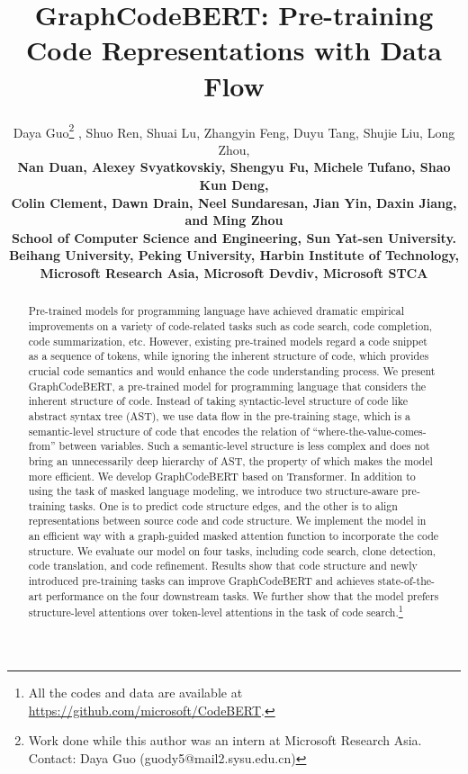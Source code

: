 \documentclass{article} \usepackage{iclr2021_conference,times}
\title{GraphCodeBERT: Pre-training Code Representations with Data Flow}
\author{Daya Guo\thanks{Work done while this author was an intern at Microsoft Research Asia. Contact: Daya Guo (guody5@mail2.sysu.edu.cn) } , Shuo Ren, Shuai Lu, Zhangyin Feng, Duyu Tang, Shujie Liu, Long Zhou, \\ \bf{Nan Duan, Alexey Svyatkovskiy, Shengyu Fu, Michele Tufano, Shao Kun Deng,} \\ \bf{Colin Clement, Dawn Drain, Neel Sundaresan, Jian Yin, Daxin Jiang, and Ming Zhou}  \\
School of Computer Science and Engineering, Sun Yat-sen University. \\ Beihang University,  Peking University,
Harbin Institute of Technology, \\ Microsoft Research Asia, Microsoft Devdiv, Microsoft STCA}
\begin{document}
\maketitle
\vskip -0.1in
\begin{abstract}

Pre-trained models for programming language have achieved dramatic empirical improvements on a variety of code-related tasks such as code search, code completion, code summarization, etc. 
However, existing pre-trained models regard a code snippet as a sequence of tokens, while ignoring the inherent structure of code, which provides crucial code semantics and would enhance the code understanding process.
We present GraphCodeBERT, a pre-trained model for programming language that considers the inherent structure of code.
Instead of taking syntactic-level structure of code like abstract syntax tree (AST), we use data flow in the pre-training stage, which is a semantic-level structure of code that encodes the relation of ``where-the-value-comes-from'' between variables. Such a semantic-level structure is less complex and does not bring an unnecessarily deep hierarchy of AST, the property of which makes the model more efficient.
We develop GraphCodeBERT based on Transformer. In addition to using the task of masked language modeling, we introduce two structure-aware pre-training tasks. One is to predict code structure edges, and the other is
to align representations between source code and code structure.
We implement the model in an efficient way with a graph-guided masked attention function to incorporate the code structure.
We evaluate our model on four tasks, including code search, clone detection, code translation, and code refinement. Results show that code structure and newly introduced pre-training tasks can improve GraphCodeBERT and achieves state-of-the-art performance on the four downstream tasks. We further show that the model prefers structure-level attentions over token-level attentions in the task of code search.\footnote{All the codes and data are available at \url{https://github.com/microsoft/CodeBERT}.}
\end{abstract}
\end{document}

